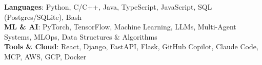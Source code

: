 \begin{itemize}[leftmargin=0.15in, label={}]
    \small{\item{
     \textbf{Languages}{: Python, C/C++, Java, TypeScript, JavaScript, SQL (Postgres/SQLite), Bash} \\
     \textbf{ML \& AI}{: PyTorch, TensorFlow, Machine Learning, LLMs, Multi-Agent Systems, MLOps, Data Structures \& Algorithms} \\
     \textbf{Tools \& Cloud}{: React, Django, FastAPI, Flask, GitHub Copilot, Claude Code, MCP, AWS, GCP, Docker}
    }}
\end{itemize}
